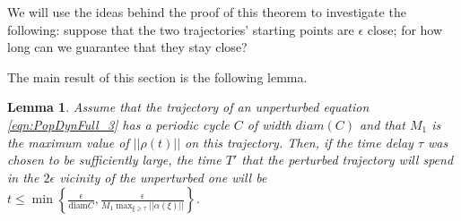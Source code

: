 \documentclass{article}
\newtheorem{lemma}{Lemma}[section]
\begin{document}
We will use the ideas behind the proof of this theorem to investigate the following: suppose that the two trajectories' starting points are  $\epsilon$ close; for how long can we guarantee that they stay close?

The main result of this section is the following lemma.
\begin{lemma}
\label{lem: dynamics LV}
    Assume that the trajectory of an unperturbed equation \eqref{eqn:PopDynFull_3} has a periodic cycle $C$ of width $diam (C)$  and that $M_1$ is the maximum value of $||\rho(t)||$ on this trajectory. Then, if the time delay $\tau$  was chosen to be sufficiently large, the time $T'$ that the perturbed trajectory will spend in the $2\epsilon$ vicinity of the unperturbed one will be $t\le \min\left\{\frac{\epsilon}{\mathrm{diam} C}, \frac{\epsilon}{M_1\max_{\xi\ge\tau}||\alpha(\xi)||}\right\}$.
\end{lemma}
\end{document}
